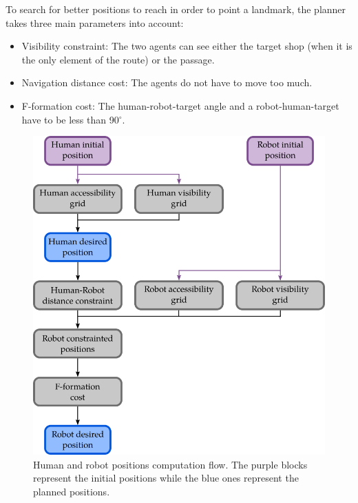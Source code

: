 To search for better positions to reach in order to point a landmark, the planner takes three main parameters into account:

\begin{itemize}
    \item Visibility constraint: The two agents can see either the target shop (when it is the only element of the route) or the passage.
    \item Navigation distance cost: The agents do not have to move too much.
    \item F-formation cost: The human-robot-target angle and a robot-human-target have to be less than 90${^\circ}$. 
\end{itemize}

\begin{figure}[b!]
\centering
\includegraphics[scale=0.44]{figures/chapter8/svp.png}
\caption{\label{fig:chap8_svp} Human and robot positions computation flow. The purple blocks represent the initial positions while the blue ones represent the planned positions. }
\end{figure}

